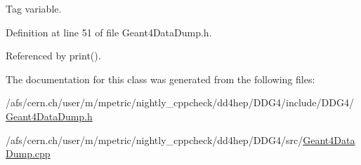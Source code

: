 Tag variable. 

Definition at line 51 of file Geant4DataDump.h.

Referenced by print().

The documentation for this class was generated from the following files:\begin{DoxyCompactItemize}
\item 
/afs/cern.ch/user/m/mpetric/nightly\_\-cppcheck/dd4hep/DDG4/include/DDG4/\hyperlink{_geant4_data_dump_8h}{Geant4DataDump.h}\item 
/afs/cern.ch/user/m/mpetric/nightly\_\-cppcheck/dd4hep/DDG4/src/\hyperlink{_geant4_data_dump_8cpp}{Geant4DataDump.cpp}\end{DoxyCompactItemize}
